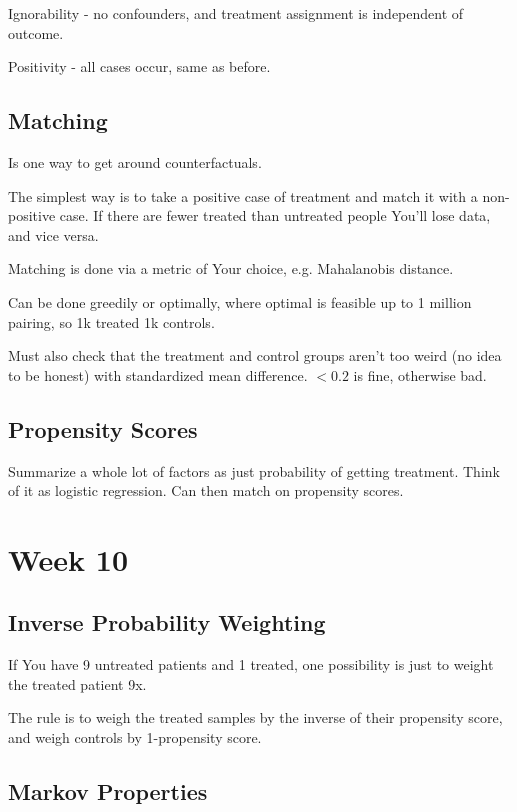 \documentclass{article}
\begin{document}
		Ignorability - no confounders, and treatment assignment is independent of outcome.
		
		Positivity - all cases occur, same as before.
		
	\subsection{Matching}
	
		Is one way to get around counterfactuals.
		
		The simplest way is to take a positive case of treatment and match it with a non-positive case. If there are fewer treated than untreated people You'll lose data, and vice versa.
		
		Matching is done via a metric of Your choice, e.g. Mahalanobis distance.
		
		Can be done greedily or optimally, where optimal is feasible up to 1 million pairing, so 1k treated 1k controls.
		
		Must also check that the treatment and control groups aren't too weird (no idea to be honest) with standardized mean difference. $<0.2$ is fine, otherwise bad.
		
	\subsection{Propensity Scores}
	
		Summarize a whole lot of factors as just probability of getting treatment. Think of it as logistic regression. Can then match on propensity scores.
		
\section{Week 10}

	\subsection{Inverse Probability Weighting}
	
		If You have 9 untreated patients and 1 treated, one possibility is just to weight the treated patient 9x.
		
		The rule is to weigh the treated samples by the inverse of their propensity score, and weigh controls by 1-propensity score.
		
	\subsection{Markov Properties}
	
\end{document}

